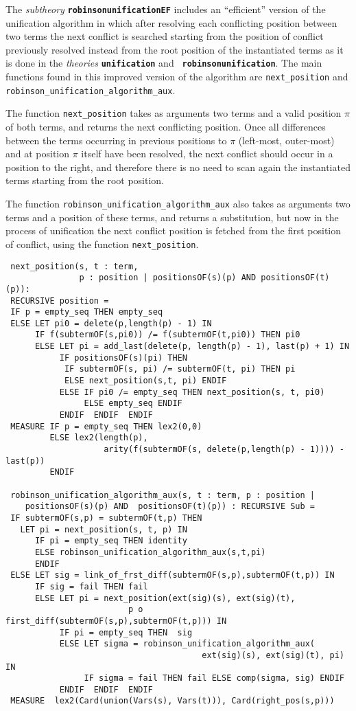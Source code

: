 \documentclass[submission,copyright,creativecommons]{eptcs}
\begin{document}
The \emph{subtheory} {\tt \bf robinsonunificationEF} includes an
``efficient'' version of the unification algorithm in which after
resolving each conflicting position between two terms the next
conflict is searched starting from the position of conflict previously
resolved instead from the root position of the instantiated terms as
it is done in the \emph{theories} {\tt \bf unification} and {\tt \bf
  robinsonunification}.  The main functions found in this improved
version of the algorithm are {\tt next\_position} and {\tt
  robinson\_unification\_algorithm\_aux}.

The function {\tt next\_position} takes as arguments two terms and a
valid position $\pi$ of both terms, and returns the next conflicting
position. Once all differences between the terms occurring in previous
positions to $\pi$ (left-most, outer-most) and at position $\pi$
itself have been resolved, the next conflict should occur in a
position to the right, and therefore there is no need to scan again
the instantiated terms starting from the root position.

The function {\tt robinson\_unification\_algorithm\_aux} also takes as
arguments two terms and a position of these terms, and returns a
substitution, but now in the process of unification the next conflict
position is fetched from the first position of conflict, using the
function {\tt next\_position}.

{\small
\begin{verbatim}
 next_position(s, t : term, 
               p : position | positionsOF(s)(p) AND positionsOF(t)(p)): 
 RECURSIVE position = 
 IF p = empty_seq THEN empty_seq 
 ELSE LET pi0 = delete(p,length(p) - 1) IN
      IF f(subtermOF(s,pi0)) /= f(subtermOF(t,pi0)) THEN pi0 
      ELSE LET pi = add_last(delete(p, length(p) - 1), last(p) + 1) IN
           IF positionsOF(s)(pi) THEN 
            IF subtermOF(s, pi) /= subtermOF(t, pi) THEN pi 
            ELSE next_position(s,t, pi) ENDIF
           ELSE IF pi0 /= empty_seq THEN next_position(s, t, pi0)
                ELSE empty_seq ENDIF 
           ENDIF  ENDIF  ENDIF  
 MEASURE IF p = empty_seq THEN lex2(0,0)
         ELSE lex2(length(p),
                    arity(f(subtermOF(s, delete(p,length(p) - 1)))) - last(p))
         ENDIF

 robinson_unification_algorithm_aux(s, t : term, p : position | 
    positionsOF(s)(p) AND  positionsOF(t)(p)) : RECURSIVE Sub = 
 IF subtermOF(s,p) = subtermOF(t,p) THEN 
   LET pi = next_position(s, t, p) IN
      IF pi = empty_seq THEN identity
      ELSE robinson_unification_algorithm_aux(s,t,pi)
      ENDIF
 ELSE LET sig = link_of_frst_diff(subtermOF(s,p),subtermOF(t,p)) IN
      IF sig = fail THEN fail
      ELSE LET pi = next_position(ext(sig)(s), ext(sig)(t), 
                         p o first_diff(subtermOF(s,p),subtermOF(t,p))) IN
           IF pi = empty_seq THEN  sig
           ELSE LET sigma = robinson_unification_algorithm_aux(
                                        ext(sig)(s), ext(sig)(t), pi) IN
                IF sigma = fail THEN fail ELSE comp(sigma, sig) ENDIF
           ENDIF  ENDIF  ENDIF 
 MEASURE  lex2(Card(union(Vars(s), Vars(t))), Card(right_pos(s,p)))
\end{verbatim}}
\end{document}
